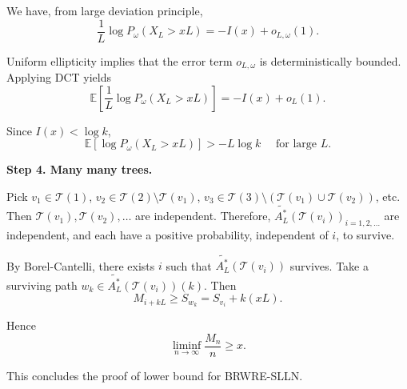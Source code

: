 We have, from large deviation principle,
\[
	\frac{1}{L} \log P_\omega(X_L > x L) = - I(x) + o_{L, \omega}(1)
.\] 

Uniform ellipticity implies that the error term $o_{L, \omega}$ is deterministically bounded. Applying DCT yields
\[
	\mathbb{E}\left[\frac{1}{L} \log P_\omega(X_L > x L)\right] = - I(x) + o_{L}(1)
.\]

Since $I(x) < \log k$,
\[
	\mathbb{E}\left[\log P_\omega(X_L > x L)\right] > - L \log k \quad \text{ for large }L
.\] 

\textbf{Step 4. Many many trees.}

Pick $v_1 \in \mathcal{T}(1)$, $v_2 \in \mathcal{T}(2) \setminus \mathcal{T}(v_1)$, $v_3 \in \mathcal{T}(3) \setminus \left( \mathcal{T}(v_1) \cup \mathcal{T}(v_2) \right) $, etc. Then $\mathcal{T}(v_1), \mathcal{T}(v_2), \ldots$ are independent. Therefore, $\widetilde{A^*_L}(\mathcal{T}(v_i))_{i= 1, 2, \ldots}$ are independent, and each have a positive probability, independent of $i$, to survive.

By Borel-Cantelli, there exists $i$ such that $\widetilde{A^*_L}(\mathcal{T}(v_i))$ survives. Take a surviving path $w_k \in \widetilde{A^*_L}(\mathcal{T}(v_i))(k)$. Then
\[
	M_{i + kL} \ge S_{w_k} = S_{v_i} + k (xL)
.\] 

Hence
\[
	\liminf_{n \to \infty } \frac{M_n}{n} \ge x
.\] 

This concludes the proof of lower bound for BRWRE-SLLN.
